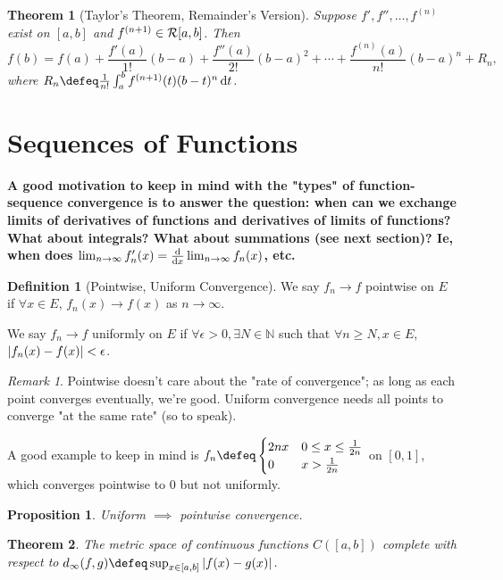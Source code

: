 \documentclass[12pt, oneside]{article}
\theoremstyle{definition}
\newtheorem{defn}{Definition}
\theoremstyle{plain}
\newtheorem{thm}{Theorem}
\newtheorem{prop}{Proposition}
\theoremstyle{remark}
\newtheorem{remark}{Remark}
\let\origsection=\section
\renewcommand\section[1]{\origsection{#1}\label{sec:\thesection}}
\begin{document}
\begin{thm}[Taylor's Theorem, Remainder's Version]
  Suppose $f', f'', \dots, f^{(n)}$ exist on $[a, b]$ and $f^{(n+1)} \in \mathcal{R}[a, b]$. Then \[
  f(b) = f(a) + \frac{f'(a)}{1!}(b-a) + \frac{f''(a)}{2!}(b-a)^2 + \cdots + \frac{f^{(n)}(a)}{n!}(b-a)^n + R_n,
  \]
  where $R_n \defeq \frac{1}{n!} \int_a^b f^{(n+1)}(t) (b - t)^{n} \dd{t}$.
\end{thm}

\section{Sequences of Functions}

\textbf{A good motivation to keep in mind with the "types" of function-sequence convergence is to answer the question: when can we exchange limits of derivatives of functions and derivatives of limits of functions? What about integrals? What about summations (see next section)? Ie, when does $\lim_{n \to \infty} f_n'(x) = \dv{x}\lim_{n \to \infty} f_n(x)$, etc.}

\begin{defn}[Pointwise, Uniform Convergence]
We say $f_n \to f$ pointwise on $E$ if $\forall x \in E$, $f_n(x) \to f(x)$ as $n \to \infty$.

We say $f_n \to f$ uniformly on $E$ if $\forall \epsilon > 0, \exists N \in \mathbb{N}$ such that $\forall n \geq N, x \in E$, $\abs{f_n(x) - f(x)} < \epsilon$.
\end{defn}

\begin{remark}
Pointwise doesn't care about the "rate of convergence"; as long as each point converges eventually, we're good. Uniform convergence needs all points to converge "at the same rate" (so to speak).

A good example to keep in mind is $f_n \defeq \begin{cases}
  2nx & 0 \leq x \leq \frac{1}{2n}\\
  0 & x > \frac{1}{2n}
\end{cases}$ on $[0, 1]$, which converges pointwise to $0$ but not uniformly.
\end{remark}
\begin{prop}
  Uniform $\implies$ pointwise convergence.
\end{prop}

\begin{thm}
  The metric space of continuous functions $C([a, b])$ complete with respect to $d_\infty(f, g) \defeq \sup_{x \in [a, b]}\abs{f(x) - g(x)}$.
\end{thm}
\end{document}

